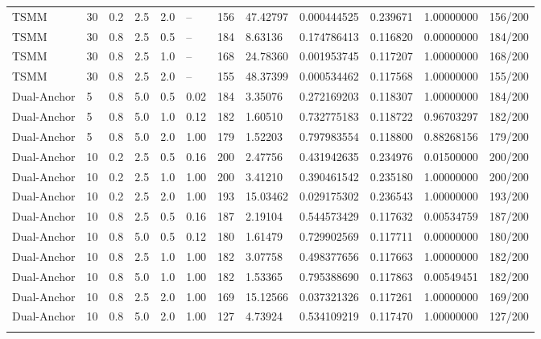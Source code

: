\begin{longtable}{llllllllllll}
TSMM & 30 & 0.2 & 2.5 & 2.0 & -- & 156 & 47.42797 & 0.000444525 & 0.239671 & 1.00000000 & 156/200 \\ \addlinespace[3pt]
TSMM & 30 & 0.8 & 2.5 & 0.5 & -- & 184 & 8.63136 & 0.174786413 & 0.116820 & 0.00000000 & 184/200 \\ \addlinespace[3pt]
TSMM & 30 & 0.8 & 2.5 & 1.0 & -- & 168 & 24.78360 & 0.001953745 & 0.117207 & 1.00000000 & 168/200 \\ \addlinespace[3pt]
TSMM & 30 & 0.8 & 2.5 & 2.0 & -- & 155 & 48.37399 & 0.000534462 & 0.117568 & 1.00000000 & 155/200 \\ \addlinespace[3pt]
Dual-Anchor & 5 & 0.8 & 5.0 & 0.5 & 0.02 & 184 & 3.35076 & 0.272169203 & 0.118307 & 1.00000000 & 184/200 \\ \addlinespace[3pt]
Dual-Anchor & 5 & 0.8 & 5.0 & 1.0 & 0.12 & 182 & 1.60510 & 0.732775183 & 0.118722 & 0.96703297 & 182/200 \\ \addlinespace[3pt]
Dual-Anchor & 5 & 0.8 & 5.0 & 2.0 & 1.00 & 179 & 1.52203 & 0.797983554 & 0.118800 & 0.88268156 & 179/200 \\ \addlinespace[3pt]
Dual-Anchor & 10 & 0.2 & 2.5 & 0.5 & 0.16 & 200 & 2.47756 & 0.431942635 & 0.234976 & 0.01500000 & 200/200 \\ \addlinespace[3pt]
Dual-Anchor & 10 & 0.2 & 2.5 & 1.0 & 1.00 & 200 & 3.41210 & 0.390461542 & 0.235180 & 1.00000000 & 200/200 \\ \addlinespace[3pt]
Dual-Anchor & 10 & 0.2 & 2.5 & 2.0 & 1.00 & 193 & 15.03462 & 0.029175302 & 0.236543 & 1.00000000 & 193/200 \\ \addlinespace[3pt]
Dual-Anchor & 10 & 0.8 & 2.5 & 0.5 & 0.16 & 187 & 2.19104 & 0.544573429 & 0.117632 & 0.00534759 & 187/200 \\ \addlinespace[3pt]
Dual-Anchor & 10 & 0.8 & 5.0 & 0.5 & 0.12 & 180 & 1.61479 & 0.729902569 & 0.117711 & 0.00000000 & 180/200 \\ \addlinespace[3pt]
Dual-Anchor & 10 & 0.8 & 2.5 & 1.0 & 1.00 & 182 & 3.07758 & 0.498377656 & 0.117663 & 1.00000000 & 182/200 \\ \addlinespace[3pt]
Dual-Anchor & 10 & 0.8 & 5.0 & 1.0 & 1.00 & 182 & 1.53365 & 0.795388690 & 0.117863 & 0.00549451 & 182/200 \\ \addlinespace[3pt]
Dual-Anchor & 10 & 0.8 & 2.5 & 2.0 & 1.00 & 169 & 15.12566 & 0.037321326 & 0.117261 & 1.00000000 & 169/200 \\ \addlinespace[3pt]
Dual-Anchor & 10 & 0.8 & 5.0 & 2.0 & 1.00 & 127 & 4.73924 & 0.534109219 & 0.117470 & 1.00000000 & 127/200 \\ \addlinespace[3pt]

\end{longtable}
